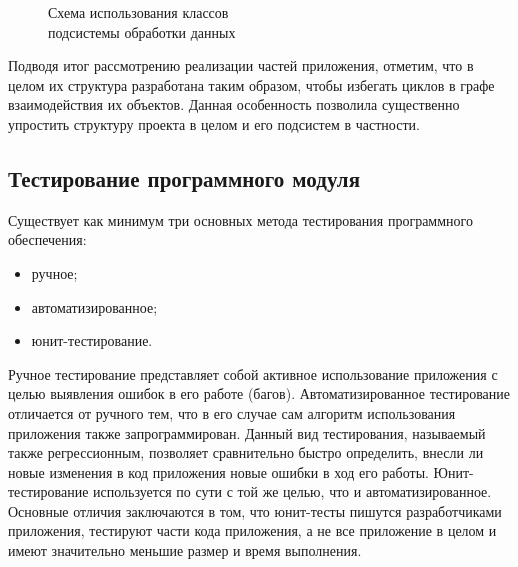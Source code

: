 \begin{figure}[h!]
  \centering
  \caption{Схема использования классов \\ подсистемы обработки данных}
  \label{fig:implementation_bl_presenter}
\end{figure}

Подводя итог рассмотрению реализации частей приложения, отметим,
что в целом их структура разработана таким образом,
чтобы избегать циклов в графе взаимодействия их объектов.
Данная особенность позволила существенно упростить
структуру проекта в целом и его подсистем в частности.



\subsection{Тестирование программного модуля}

Существует как минимум три основных метода тестирования
программного обеспечения:
\begin{itemize}
\item ручное;
\item автоматизированное;
\item юнит-тестирование.
\end{itemize}

Ручное тестирование представляет собой активное использование приложения
с целью выявления ошибок в его работе (багов).
Автоматизированное тестирование отличается от ручного тем,
что в его случае сам алгоритм использования приложения также запрограммирован.
Данный вид тестирования, называемый также регрессионным,
позволяет сравнительно быстро определить,
внесли ли новые изменения в код приложения новые ошибки в ход его работы.
Юнит-тестирование используется по сути с той же целью,
что и автоматизированное. Основные отличия заключаются в том,
что юнит-тесты пишутся разработчиками приложения,
тестируют части кода приложения, а не все приложение в целом
и имеют значительно меньшие размер и время выполнения.

